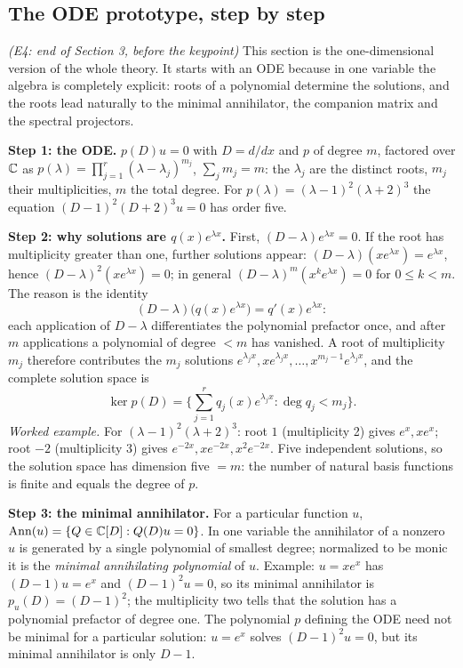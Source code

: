 \subsection{The ODE prototype, step by step}\label{expl:E4}
\noindent\emph{(E4: end of Section 3, before the keypoint)}
This section is the one-dimensional version of the whole theory. It starts with an ODE because in one variable the algebra is completely explicit: roots of a polynomial determine the solutions, and the roots lead naturally to the minimal annihilator, the companion matrix and the spectral projectors.

\medskip\textbf{Step 1: the ODE.} $p(D)u=0$ with $D=d/dx$ and $p$ of degree $m$, factored over $\mathbb{C}$ as $p(\lambda)=\prod_{j=1}^r(\lambda-\lambda_j)^{m_j}$, $\sum_jm_j=m$: the $\lambda_j$ are the distinct roots, $m_j$ their multiplicities, $m$ the total degree. For $p(\lambda)=(\lambda-1)^2(\lambda+2)^3$ the equation $(D-1)^2(D+2)^3u=0$ has order five.

\medskip\textbf{Step 2: why solutions are $q(x)e^{\lambda x}$.} First, $(D-\lambda)e^{\lambda x}=0$. If the root has multiplicity greater than one, further solutions appear: $(D-\lambda)(xe^{\lambda x})=e^{\lambda x}$, hence $(D-\lambda)^2(xe^{\lambda x})=0$; in general $(D-\lambda)^m(x^ke^{\lambda x})=0$ for $0\le k<m$. The reason is the identity
\[
(D-\lambda)\big(q(x)e^{\lambda x}\big)=q'(x)e^{\lambda x}:
\]
each application of $D-\lambda$ differentiates the polynomial prefactor once, and after $m$ applications a polynomial of degree $<m$ has vanished. A root of multiplicity $m_j$ therefore contributes the $m_j$ solutions $e^{\lambda_jx},xe^{\lambda_jx},\dots,x^{m_j-1}e^{\lambda_jx}$, and the complete solution space is
\[
\ker p(D)=\Big\{\sum_{j=1}^rq_j(x)e^{\lambda_jx}:\deg q_j<m_j\Big\}.
\]
\emph{Worked example.} For $(\lambda-1)^2(\lambda+2)^3$: root $1$ (multiplicity 2) gives $e^x,xe^x$; root $-2$ (multiplicity 3) gives $e^{-2x},xe^{-2x},x^2e^{-2x}$. Five independent solutions, so the solution space has dimension five $=m$: the number of natural basis functions is finite and equals the degree of $p$.

\medskip\textbf{Step 3: the minimal annihilator.} For a particular function $u$, $\operatorname{Ann}(u)=\{Q\in\mathbb{C}[D]:Q(D)u=0\}$. In one variable the annihilator of a nonzero $u$ is generated by a single polynomial of smallest degree; normalized to be monic it is the \emph{minimal annihilating polynomial} of $u$. Example: $u=xe^x$ has $(D-1)u=e^x$ and $(D-1)^2u=0$, so its minimal annihilator is $p_u(D)=(D-1)^2$; the multiplicity two tells that the solution has a polynomial prefactor of degree one. The polynomial $p$ defining the ODE need not be minimal for a particular solution: $u=e^x$ solves $(D-1)^2u=0$, but its minimal annihilator is only $D-1$.


